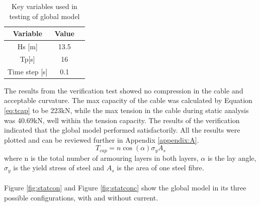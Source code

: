 \begin{table} [H]
\centering
\begin{tabular}{ |c|c|c|}
\hline
Variable & Value \\
 \hline
 \hline
Hs [m] & 13.5\\
Tp[s] & 16 \\
Time step [s] & 0.1 \\
 \hline
\end{tabular}
\caption{Key variables used in testing of global model}
\label{table:testglob}
\end{table}
The results from the verification test showed no compression in the cable and acceptable curvature. The max capacity of the cable was calculated by Equation \ref{eq:tcap} to be 223kN, while the max tension in the cable during static analysis was 40.69kN, well within the tension capacity.
The results of the verification indicated that the global model performed satisfactorily. All the results were plotted and can be reviewed further in Appendix \ref{appendix:A}.
\begin{equation}
    T_{cap}=n \cos{(\alpha)} \sigma_y A_s
   \label{eq:tcap}
\end{equation}
where n is the total number of armouring layers in both layers, $\alpha$ is the lay angle, $\sigma_y$ is the yield stress of steel and $A_s$ is the area of one steel fibre.\\\\ 
 Figure \ref{fig:statcon} and Figure \ref{fig:statconc} show the global model in its three possible configurations, with and without current. 
